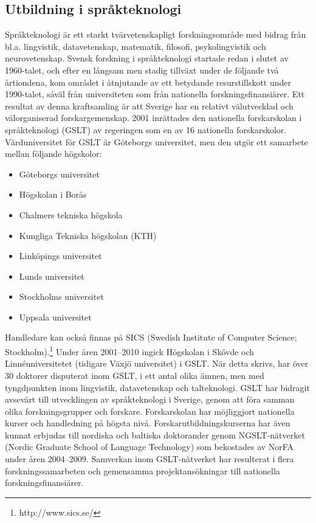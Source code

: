 \begin{multicols}{2}
\subsection{Utbildning i språkteknologi}

Språkteknologi är ett starkt tvärvetenskapligt forskningsområde med
bidrag från bl.a. lingvistik, datavetenskap, matematik, filosofi,
psykolingvistik och neurovetenskap. Svensk forskning i språkteknologi
startade redan i slutet av 1960-talet, och efter en långsam men stadig
tillväxt under de följande två årtiondena, kom området i åtnjutande av
ett betydande resurstillskott under 1990-talet, såväl från
universiteten som från nationella forskningsfinansiärer. Ett resultat
av denna kraftsamling är att Sverige har en relativt välutvecklad och
välorganiserad forskargemenskap. 2001 inrättades den nationella
forskarskolan i språkteknologi (GSLT) av regeringen som en av 16
nationella forskarskolor. Värduniversitet för GSLT är Göteborgs
universitet, men den utgör ett samarbete mellan följande högskolor:

\begin{itemize}
\item Göteborgs universitet
\item Högskolan i Borås
\item Chalmers tekniska högskola
\item Kungliga Tekniska högskolan (KTH)
\item Linköpings universitet
\item Lunds universitet
\item Stockholms universitet
\item Uppsala universitet
\end{itemize}

Handledare kan också finnas på SICS (Swedish Institute of Computer
Science; Stockholm).\footnote{http://www.sics.se/} Under åren
2001--2010 ingick Högskolan i Skövde och Linnéuniversitetet (tidigare
Växjö universitet) i GSLT. När detta skrivs, har över 30 doktorer
disputerat inom GSLT, i ett antal olika ämnen, men med tyngdpunkten
inom lingvistik, datavetenskap och talteknologi. GSLT har bidragit
avsevärt till utvecklingen av språkteknologi i Sverige, genom att föra
samman olika forskningsgrupper och forskare. Forskarskolan har
möjliggjort nationella kurser och handledning på högsta
nivå. Forskarutbildningskurserna har även kunnat erbjudas till
nordiska och baltiska doktorander genom NGSLT-nätverket (Nordic
Graduate School of Language Technology) som bekostades av NorFA under
åren 2004--2009. Samverkan inom GSLT-nätverket har resulterat i flera
forskningssamarbeten och gemensamma projektansökningar till nationella
forskningsfinansiärer.


\end{multicols}
